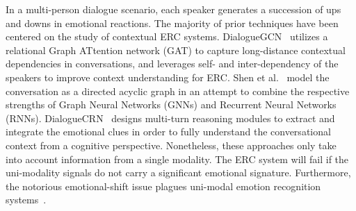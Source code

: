\documentclass[lettersize,journal]{IEEEtran}
\begin{document}
\IEEEpubidadjcol
In a multi-person dialogue scenario, each speaker generates a succession of ups and downs in emotional reactions. The majority of prior techniques have been centered on the study of contextual ERC systems. DialogueGCN~\cite{ghosal2019dialoguegcn} utilizes a relational Graph ATtention network (GAT) to capture long-distance contextual dependencies in conversations, and leverages self- and inter-dependency of the speakers to improve context understanding for ERC. Shen et al.~\cite{DBLP:conf/acl/ShenWYQ20} model the conversation as a directed acyclic graph in an attempt to combine the respective strengths of Graph Neural Networks (GNNs) and Recurrent Neural Networks (RNNs). DialogueCRN~\cite{hu2021dialoguecrn} designs multi-turn reasoning modules to extract and integrate the emotional clues in order to fully understand the conversational context from a cognitive perspective. Nonetheless, these approaches only take into account information from a single modality. The ERC system will fail if the uni-modality signals do not carry a significant emotional signature. Furthermore, the notorious emotional-shift issue plagues uni-modal emotion recognition systems~\cite{majumder2019dialoguernn,DBLP:conf/acl/ShenWYQ20}.
\end{document}
